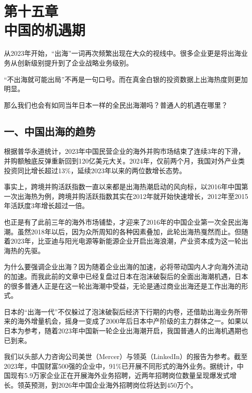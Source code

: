 

\section[第十五章\q 中国的机遇期]{第十五章\\ 中国的机遇期}


{\fangsong 从2023年开始，“出海”一词再次频繁出现在大众的视线中。很多企业更是将出海业务从创新级别提升到了企业战略业务级别。\par}

{\fangsong “不出海就可能出局”不再是一句口号。而在真金白银的投资数据上出海热度则更加明显。\par}

{\fangsong 那么我们也会有如同当年日本一样的全民出海潮吗？普通人的机遇在哪里？\par}

\subsection{一、中国出海的趋势}

根据普华永道统计，2023年中国民营企业的海外并购市场结束了连续3年的下滑，并购额触底反弹重新回到120亿美元大关。2024年，仅前两个月，我国对外产业类投资同比增长超过13\%，延续2023年以来的两位数增长态势。

事实上，跨境并购活跃指数一直以来都是出海热潮启动的风向标，以2016年中国第一次出海热为例，跨境并购活跃指数其实在2012年就开始快速增长，2012年至2015年活跃度3年增长超过一倍。

也正是有了此前三年的海外市场铺垫，才迎来了2016年的中国企业第一次全民出海潮。虽然2018年以后，因为众所周知的各种因素叠加，此轮出海热戛然而止。但随着2023年，比亚迪与阳光电源等新能源企业开启出海浪潮，产业资本成为这一轮出海热的先驱。

为什么要强调企业出海？因为随着企业出海的加速，必将带动国内人才向海外流动的加速。而我此前的文章中已经复盘过日本在泡沫破裂后的全面出海潮机遇，日本的很多普通人正是在这一轮出海潮中受益，无论是通过商业出海还是工作出海的形式。

日本的“出海一代”不仅躲过了泡沫破裂后经济下行期的内卷，还借助出海业务所带来的海外增量机会，摇身一变成了2000年后日本中产阶级的主力群体之一。如果以日本为参考，随着2023年中国新一轮企业出海潮开启，我国普通人的出海机遇期也已到来。

我们以头部人力咨询公司美世（Mercer）与领英（LinkedIn）的报告为参考。截至2023年，中国财富500强的企业中，91\%已开展不同形式的海外业务。据统计，中国现有5.9万家企业正在开展海外业务招聘，近两年招聘岗位数量呈现爆发式增长。领英预测，到2026年中国企业海外招聘岗位将达到450万个。

